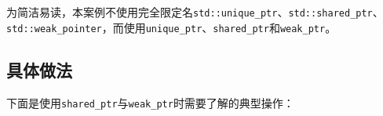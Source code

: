 
\begin{myNote}
为简洁易读，本案例不使用完全限定名\texttt{std::\allowbreak{}unique\_\allowbreak{}ptr}、\texttt{std::\allowbreak{}shared\_\allowbreak{}ptr}、\texttt{std::\allowbreak{}weak\_\allowbreak{}pointer}，而使用\texttt{unique\_\allowbreak{}ptr}、\texttt{shared\_\allowbreak{}ptr}和\texttt{weak\_\allowbreak{}ptr}。
\end{myNote}



\subsection{具体做法}



下面是使用\texttt{shared\_\allowbreak{}ptr}与\texttt{weak\_\allowbreak{}ptr}时需要了解的典型操作：



